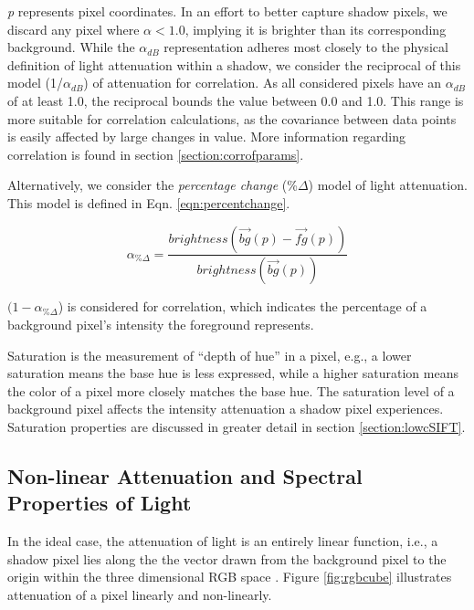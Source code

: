 \textit{p} represents pixel coordinates. In an effort to better capture shadow pixels, we discard any pixel where $\alpha < 1.0$, implying it is brighter than its corresponding background. While the $\alpha_{dB}$ representation adheres most closely to the physical definition of light attenuation within a shadow, we consider the reciprocal of this model (1/$\alpha_{dB}$) of attenuation for correlation. As all considered pixels have an $\alpha_{dB}$ of at least 1.0, the reciprocal bounds the value between 0.0 and 1.0. This range is more suitable for correlation calculations, as the covariance between data points is easily affected by large changes in value. More information regarding correlation is found in section \ref{section:corrofparams}.

Alternatively, we consider the \textit{percentage change} (\%$\Delta$) model of light attenuation. This model is defined in Eqn. \ref{eqn:percentchange}.

\begin{equation}
\alpha_{\%\Delta} = \dfrac{brightness(\vec{bg}(p) - \vec{fg}(p))}{brightness(\vec{bg}(p))}
\label{eqn:percentchange}
\end{equation}

$(1 - \alpha_{\%\Delta}$) is considered for correlation, which indicates the percentage of a background pixel's intensity the foreground represents.

Saturation is the measurement of ``depth of hue'' in a pixel, e.g., a lower saturation means the base hue is less expressed, while a higher saturation means the color of a pixel more closely matches the base hue. The saturation level of a background pixel affects the intensity attenuation a shadow pixel experiences. Saturation properties are discussed in greater detail in section \ref{section:lowcSIFT}.

\subsection{Non-linear Attenuation and Spectral Properties of Light} \label{section:nonlinearatten}

In the ideal case, the attenuation of light is an entirely linear function, i.e., a shadow pixel lies along the the vector drawn from the background pixel to the origin within the three dimensional RGB space \cite{huang2009moving}. Figure \ref{fig:rgbcube} illustrates attenuation of a pixel linearly and non-linearly.

